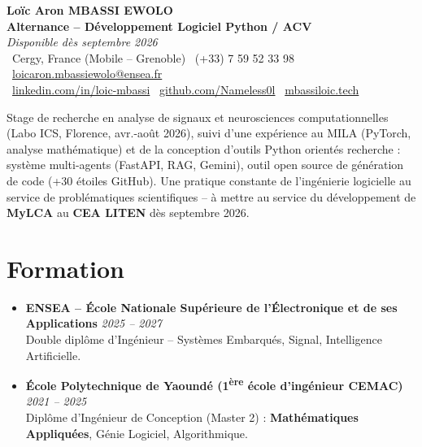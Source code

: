 \documentclass[a4paper,11pt]{article}
\begin{document}
\begin{center}
    {\Large \textbf{Loïc Aron MBASSI EWOLO}} \\ \vspace{4pt}
    \textbf{\large Alternance -- Développement Logiciel Python / ACV} \\
    \textit{\small Disponible dès septembre 2026} \\ \vspace{4pt}
    \small
    \faMapMarker\ Cergy, France (Mobile -- Grenoble) \quad
    \faPhone\ (+33) 7 59 52 33 98 \quad
    \faEnvelope\ \href{mailto:loicaron.mbassiewolo@ensea.fr}{loicaron.mbassiewolo@ensea.fr} \\ \vspace{2pt}
    \faLinkedin\ \href{https://www.linkedin.com/in/loic-mbassi/}{linkedin.com/in/loic-mbassi} \quad
    \faGithub\ \href{https://github.com/Nameless0l}{github.com/Nameless0l} \quad
    \faGlobe\ \href{https://mbassiloic.tech}{mbassiloic.tech}
\end{center}

\vspace{-6pt}

\noindent\small{Stage de recherche en analyse de signaux et neurosciences computationnelles (Labo ICS, Florence, avr.-août 2026), suivi d'une expérience au MILA (PyTorch, analyse mathématique) et de la conception d'outils Python orientés recherche : système multi-agents (FastAPI, RAG, Gemini), outil open source de génération de code (+30 étoiles GitHub). Une pratique constante de l'ingénierie logicielle au service de problématiques scientifiques -- à mettre au service du développement de \textbf{MyLCA} au \textbf{CEA LITEN} dès septembre 2026.}

\section{Formation}
\begin{itemize}[leftmargin=*, label=\tiny$\bullet$, nosep]
    \item \textbf{ENSEA -- École Nationale Supérieure de l'Électronique et de ses Applications} \hfill \textit{2025 -- 2027} \\
    \small{Double diplôme d'Ingénieur -- Systèmes Embarqués, Signal, Intelligence Artificielle.}
    \item \textbf{École Polytechnique de Yaoundé (1\textsuperscript{ère} école d'ingénieur CEMAC)} \hfill \textit{2021 -- 2025} \\
    \small{Diplôme d'Ingénieur de Conception (Master 2) : \textbf{Mathématiques Appliquées}, Génie Logiciel, Algorithmique.}
\end{itemize}
\end{document}
